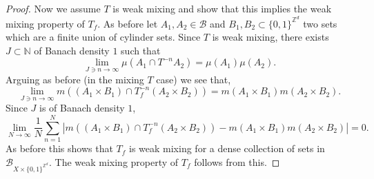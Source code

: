 \documentclass[10pt,a4paper]{amsart}
\newcommand{\B}{\mathcal{B}}
\newcommand{\N}{\mathbb{N}}
\newcommand{\Z}{\mathbb{Z}}
\begin{document}
\begin{proof}
Now we assume $T$ is weak mixing and show that this implies the weak mixing property of $T_f$. As before let $A_1,A_2\in\B$ and $B_1,B_2\subset\{0,1\}^{\Z^d}$ two sets which are a finite union of cylinder sets. Since $T$ is weak mixing, there exists $J\subset \N$ of Banach density $1$ such that 
\[
\lim_{J\ni n\to\infty}\mu\left(A_1\cap T^{-n}A_2\right)=\mu\left(A_1\right)\mu\left(A_2\right). 
\]
Arguing as before (in the mixing $T$ case) we see that,
\[
\lim_{J\ni n\to\infty}m\left(\left(A_1\times B_1\right)\cap T_f^{-n}\left(A_2\times B_2\right)\right)=m\left(A_1\times B_1\right) m\left(A_2\times B_2\right). 
\]
Since $J$ is of Banach density $1$, 
\[
\lim_{N\to\infty}\frac{1}{N}\sum_{n=1}^N\left|m\left(\left(A_1\times B_1\right)\cap T_f^{-n}\left(A_2\times B_2\right)\right)-m\left(A_1\times B_1\right)m\left(A_2\times B_2\right)\right|=0.
\]
As before this shows that $T_f$ is weak mixing for a dense collection of sets in $\B_{X\times\{0,1\}^{\Z^d}}$. The weak mixing property of $T_f$ follows from this.


\end{proof}
\end{document}
